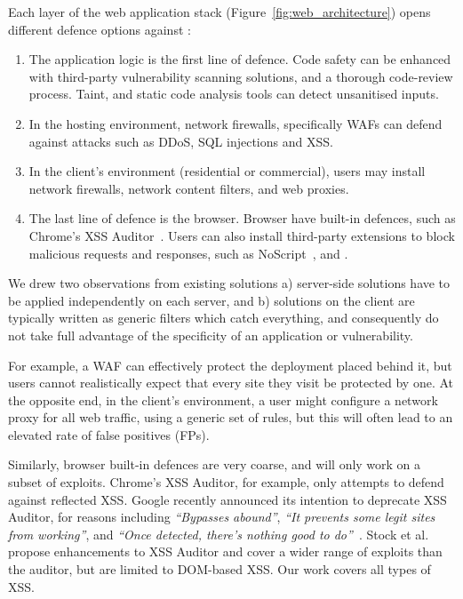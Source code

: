 Each layer of the web application stack  (Figure~\ref{fig:web_architecture}) opens different defence options against \xss:
\begin{enumerate}

\item The application logic is the first line of defence.
  Code safety can be enhanced with third-party vulnerability scanning solutions, and a thorough
  code-review process. Taint, and static code analysis tools can detect unsanitised inputs.

\item In the hosting environment, network firewalls, specifically \acp{WAF} can defend against attacks such as \ac{DDoS}, \ac{SQL} injections and \ac{XSS}.

\item In the client's environment (residential or commercial), users may install network firewalls, network content filters, and web proxies.

\item The last line of defence is the browser.
  Browser have built-in defences, such as
  Chrome's \ac{XSS} Auditor~\cite{xssauditor}. Users can also
  install third-party extensions to block malicious requests and
  responses, such as NoScript~\cite{Noscript}, and \sys.
\end{enumerate}

We drew two observations from existing solutions a) server-side
solutions have to be applied independently on each server, and b)
solutions on the client are typically written as generic filters which
catch everything, and consequently do not take full advantage
of the specificity of an application or vulnerability.

For example, a \ac{WAF} can effectively protect the deployment
placed behind it, but users cannot realistically expect that every
site they visit be protected by one. At the opposite end, in the client's
environment, a user might configure a network proxy for all web
traffic, using a generic set of rules, but this will often lead to an
elevated rate of false positives (FPs).

Similarly, browser built-in defences are very coarse, and will only work on a subset of exploits. Chrome's XSS
Auditor, for example, only attempts to defend against reflected
\ac{XSS}. Google recently announced its intention to deprecate
XSS Auditor, for reasons including \emph{``Bypasses abound''}, \emph{``It prevents
some legit sites from working''}, and \emph{``Once detected, there's nothing
good to do''}~\cite{deprecatexssauditor}. Stock et
al.~\cite{precise_dom_xss} propose enhancements to
XSS Auditor and cover a wider range of exploits than the
auditor, but are limited to DOM-based \ac{XSS}.
Our work covers all types of \ac{XSS}.

